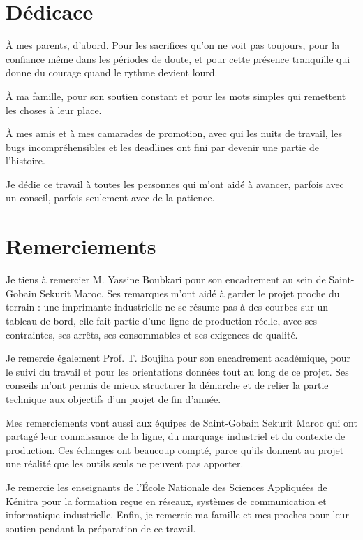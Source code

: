 \documentclass[12pt,a4paper,oneside]{report}
\begin{document}
\hypersetup{pageanchor=true}

\chapter*{Dédicace}
À mes parents, d'abord. Pour les sacrifices qu'on ne voit pas toujours, pour la
confiance même dans les périodes de doute, et pour cette présence tranquille qui
donne du courage quand le rythme devient lourd.

À ma famille, pour son soutien constant et pour les mots simples qui remettent
les choses à leur place.

À mes amis et à mes camarades de promotion, avec qui les nuits de travail, les
bugs incompréhensibles et les deadlines ont fini par devenir une partie de
l'histoire.

Je dédie ce travail à toutes les personnes qui m'ont aidé à avancer, parfois
avec un conseil, parfois seulement avec de la patience.

\chapter*{Remerciements}
Je tiens à remercier M. Yassine Boubkari pour son encadrement au sein de
Saint-Gobain Sekurit Maroc. Ses remarques m'ont aidé à garder le projet proche
du terrain : une imprimante industrielle ne se résume pas à des courbes sur un
tableau de bord, elle fait partie d'une ligne de production réelle, avec ses
contraintes, ses arrêts, ses consommables et ses exigences de qualité.

Je remercie également Prof. T. Boujiha pour son encadrement académique, pour le
suivi du travail et pour les orientations données tout au long de ce projet.
Ses conseils m'ont permis de mieux structurer la démarche et de relier la partie
technique aux objectifs d'un projet de fin d'année.

Mes remerciements vont aussi aux équipes de Saint-Gobain Sekurit Maroc qui ont
partagé leur connaissance de la ligne, du marquage industriel et du contexte de
production. Ces échanges ont beaucoup compté, parce qu'ils donnent au projet une
réalité que les outils seuls ne peuvent pas apporter.

Je remercie les enseignants de l'École Nationale des Sciences Appliquées de
Kénitra pour la formation reçue en réseaux, systèmes de communication et
informatique industrielle. Enfin, je remercie ma famille et mes proches pour
leur soutien pendant la préparation de ce travail.
\end{document}
